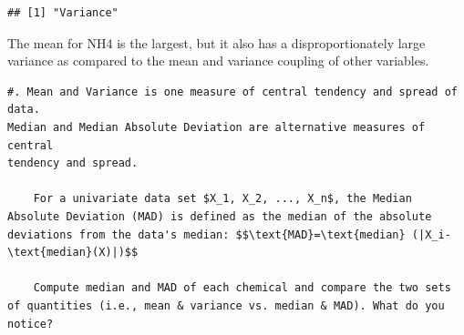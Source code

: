 \documentclass[]{article}
\newenvironment{Shaded}{\begin{snugshade}}{\end{snugshade}}
\newcommand{\KeywordTok}[1]{\textcolor[rgb]{0.13,0.29,0.53}{\textbf{#1}}}
\newcommand{\DataTypeTok}[1]{\textcolor[rgb]{0.13,0.29,0.53}{#1}}
\newcommand{\StringTok}[1]{\textcolor[rgb]{0.31,0.60,0.02}{#1}}
\newcommand{\OtherTok}[1]{\textcolor[rgb]{0.56,0.35,0.01}{#1}}
\newcommand{\ControlFlowTok}[1]{\textcolor[rgb]{0.13,0.29,0.53}{\textbf{#1}}}
\newcommand{\OperatorTok}[1]{\textcolor[rgb]{0.81,0.36,0.00}{\textbf{#1}}}
\newcommand{\NormalTok}[1]{#1}
\begin{document}
\begin{Shaded}
\end{Shaded}

\begin{verbatim}
## [1] "Variance"
\end{verbatim}

\begin{Shaded}
\end{Shaded}

The mean for NH4 is the largest, but it also has a disproportionately
large variance as compared to the mean and variance coupling of other
variables.

\begin{verbatim}
#. Mean and Variance is one measure of central tendency and spread of data.
Median and Median Absolute Deviation are alternative measures of central
tendency and spread. 

    For a univariate data set $X_1, X_2, ..., X_n$, the Median Absolute Deviation (MAD) is defined as the median of the absolute deviations from the data's median: $$\text{MAD}=\text{median} (|X_i-\text{median}(X)|)$$

    Compute median and MAD of each chemical and compare the two sets of quantities (i.e., mean & variance vs. median & MAD). What do you notice? 
    
\end{verbatim}
\end{document}

